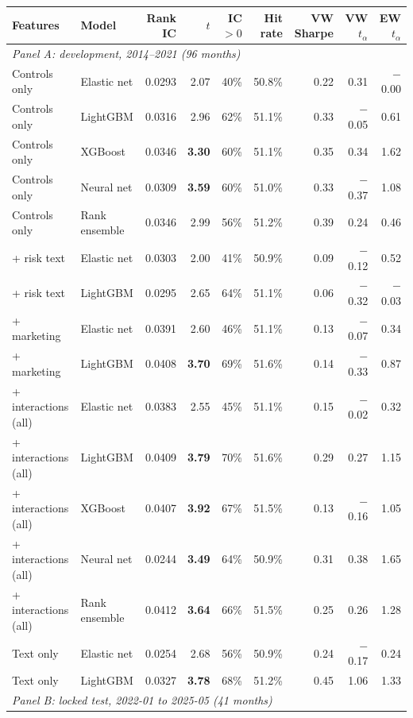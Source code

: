 \begin{tabular}{llrrrrrrr}
\toprule
Features & Model & Rank IC & $t$ & IC $>0$ & Hit rate & VW Sharpe & VW $t_\alpha$ & EW $t_\alpha$ \\
\midrule
\multicolumn{9}{l}{\textit{Panel A: development, 2014--2021 (96 months)}} \\
Controls only & Elastic net & 0.0293 & 2.07 & 40\% & 50.8\% & 0.22 & 0.31 & \ensuremath{-}0.00 \\
Controls only & LightGBM & 0.0316 & 2.96 & 62\% & 51.1\% & 0.33 & \ensuremath{-}0.05 & 0.61 \\
Controls only & XGBoost & 0.0346 & \textbf{3.30} & 60\% & 51.1\% & 0.35 & 0.34 & 1.62 \\
Controls only & Neural net & 0.0309 & \textbf{3.59} & 60\% & 51.0\% & 0.33 & \ensuremath{-}0.37 & 1.08 \\
Controls only & Rank ensemble & 0.0346 & 2.99 & 56\% & 51.2\% & 0.39 & 0.24 & 0.46 \\
+ risk text & Elastic net & 0.0303 & 2.00 & 41\% & 50.9\% & 0.09 & \ensuremath{-}0.12 & 0.52 \\
+ risk text & LightGBM & 0.0295 & 2.65 & 64\% & 51.1\% & 0.06 & \ensuremath{-}0.32 & \ensuremath{-}0.03 \\
+ marketing & Elastic net & 0.0391 & 2.60 & 46\% & 51.1\% & 0.13 & \ensuremath{-}0.07 & 0.34 \\
+ marketing & LightGBM & 0.0408 & \textbf{3.70} & 69\% & 51.6\% & 0.14 & \ensuremath{-}0.33 & 0.87 \\
+ interactions (all) & Elastic net & 0.0383 & 2.55 & 45\% & 51.1\% & 0.15 & \ensuremath{-}0.02 & 0.32 \\
+ interactions (all) & LightGBM & 0.0409 & \textbf{3.79} & 70\% & 51.6\% & 0.29 & 0.27 & 1.15 \\
+ interactions (all) & XGBoost & 0.0407 & \textbf{3.92} & 67\% & 51.5\% & 0.13 & \ensuremath{-}0.16 & 1.05 \\
+ interactions (all) & Neural net & 0.0244 & \textbf{3.49} & 64\% & 50.9\% & 0.31 & 0.38 & 1.65 \\
+ interactions (all) & Rank ensemble & 0.0412 & \textbf{3.64} & 66\% & 51.5\% & 0.25 & 0.26 & 1.28 \\
Text only & Elastic net & 0.0254 & 2.68 & 56\% & 50.9\% & 0.24 & \ensuremath{-}0.17 & 0.24 \\
Text only & LightGBM & 0.0327 & \textbf{3.78} & 68\% & 51.2\% & 0.45 & 1.06 & 1.33 \\
\midrule
\multicolumn{9}{l}{\textit{Panel B: locked test, 2022-01 to 2025-05 (41 months)}} \\

\end{tabular}
